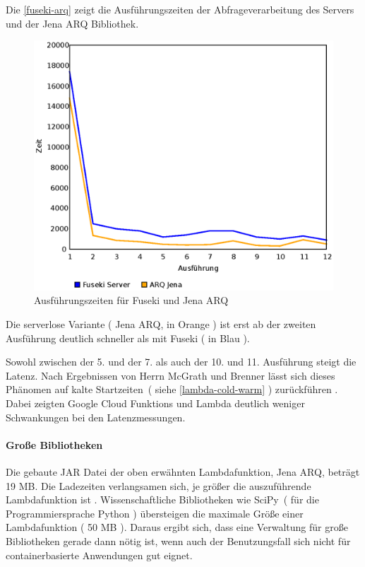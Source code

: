 \documentclass[
12pt,
english,
ngerman,
headsepline,
twoside,
openright,
numbers=noenddot,version=first
]{scrreprt}
\begin{document}
Die \autoref{fuseki-arq} zeigt die Ausführungszeiten der Abfrageverarbeitung des Servers und der Jena ARQ Bibliothek. 
\begin{figure}[h]
	\centering{}
	\includegraphics[scale=0.60]{./pics/fuseki-arq.eps}
	\caption{Ausführungszeiten für Fuseki und Jena ARQ }
	\label{fuseki-arq}
\end{figure}

Die serverlose Variante ( Jena ARQ, in Orange ) ist erst ab der zweiten Ausführung deutlich schneller als mit Fuseki ( in Blau ).


Sowohl zwischen der 5. und der 7. als auch der 10. und 11. Ausführung steigt die Latenz. Nach Ergebnissen von Herrn McGrath und Brenner lässt sich dieses Phänomen auf \glqq kalte Startzeiten\grqq\ ( siehe \autoref{lambda-cold-warm} ) zurückführen . Dabei zeigten Google Cloud Funktions und Lambda deutlich weniger Schwankungen bei den Latenzmessungen. \cite{servPerform}


\paragraph{Große Bibliotheken}
Die gebaute JAR Datei der oben erwähnten Lambdafunktion, Jena ARQ, beträgt 19 MB. Die Ladezeiten verlangsamen sich, je größer die auszuführende Lambdafunktion ist \cite{lambdaBibliothek}. Wissenschaftliche Bibliotheken wie \glqq SciPy\grqq\ ( für die Programmiersprache Python ) übersteigen die maximale Größe einer Lambdafunktion ( 50 MB ).
Daraus ergibt sich, dass eine Verwaltung für große Bibliotheken gerade dann nötig ist, wenn auch der Benutzungsfall sich nicht für containerbasierte Anwendungen gut eignet. 
\end{document}
